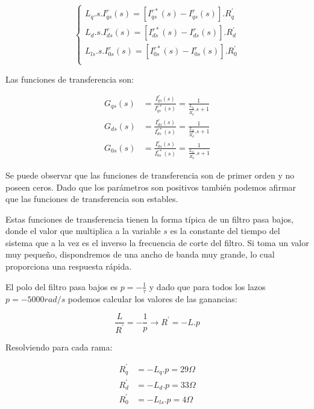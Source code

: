 \documentclass{article}
\begin{document}
\begin{equation}
    \begin{cases}
        L_q. s.I_{qs}^r(s) = [I_{qs}^{r*}(s) - I_{qs}^r(s)].R_q^\prime \\
        L_d. s.I_{ds}^r(s) = [I_{ds}^{r*}(s) - I_{ds}^r(s)].R_d^\prime \\
        L_{ls}. s.I_{0s}^r(s) = [I_{0s}^{r*}(s) - I_{0s}^r(s)].R_{0}^\prime \\
    \end{cases}
\end{equation}

Las funciones de transferencia son:

\begin{align*}
    G_{qs}(s) &= \frac{I_{qs}^r(s)}{I_{qs}^{r*}(s)} = \frac{1}{\frac{L_q}{R_q^\prime}.s + 1}  \\
    G_{ds}(s) &= \frac{I_{ds}^r(s)}{I_{ds}^{r*}(s)} = \frac{1}{\frac{L_d}{R_d^\prime}.s + 1}  \\
    G_{0s}(s) &= \frac{I_{0s}^r(s)}{I_{0s}^{r*}(s)} = \frac{1}{\frac{L_{ls}}{R_{0}^\prime}.s + 1}
\end{align*}

Se puede observar que las funciones de transferencia son de primer orden y no poseen ceros. Dado que
los parámetros son positivos también podemos afirmar que las funciones de transferencia son estables.

Estas funciones de transferencia tienen la forma típica de un filtro pasa bajos, donde el valor que
multiplica a la variable $s$ es la constante del tiempo del sistema \tau que a la vez es el inverso
la frecuencia de corte del filtro. Si \tau toma un valor muy pequeño, dispondremos de una ancho de 
banda muy grande, lo cual proporciona una respuesta rápida.

El polo del filtro pasa bajos es $p = -\frac{1}{\tau}$ y dado que para todos los lazos $p = -5000 rad/s$
podemos calcular los valores de las ganancias:

\begin{equation}
    \frac{L}{R^\prime} = -\frac{1}{p} \to R^\prime = -L.p
\end{equation}

Resolviendo para cada rama:

\begin{align*}
    R_q^\prime &= -L_q.p = 29\varOmega  \\
    R_d^\prime &= -L_d.p = 33\varOmega \\
    R_0^\prime &= -L_{ls}.p = 4\varOmega
\end{align*}
\end{document}
